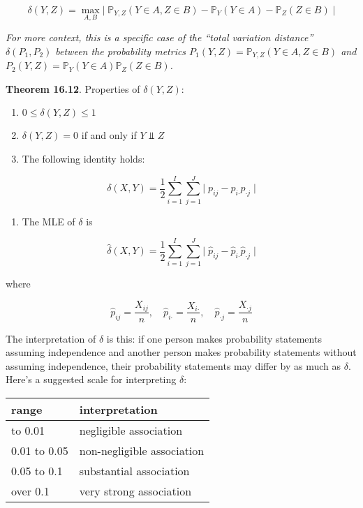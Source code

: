 {\[\delta(Y, Z) = \max_{A, B} \Big|\; \mathbb{P}_{Y, Z}(Y \in A, Z \in B) - \mathbb{P}_Y(Y \in A) - \mathbb{P}_Z(Z \in B) \;\Big|\]

\emph{For more context, this is a specific case of the ``total variation
distance'' \(\delta(P_1, P_2)\) between the probability metrics
\(P_1(Y, Z) = \mathbb{P}_{Y, Z}(Y \in A, Z \in B)\) and
\(P_2(Y, Z) = \mathbb{P}_Y(Y \in A)\mathbb{P}_Z(Z \in B)\).}

\textbf{Theorem 16.12}. Properties of \(\delta(Y, Z)\):

\begin{enumerate}[tightlist,label={\arabic*.}]
\item
  \(0 \leq \delta(Y, Z) \leq 1\)
\item
  \(\delta(Y, Z) = 0\) if and only if \(Y \text{ ⫫ } Z\)
\item
  The following identity holds:
\end{enumerate}

\[ \delta(X, Y) = \frac{1}{2} \sum_{i=1}^I \sum_{j=1}^J \Big|\; p_{ij} - p_{i\text{·}} p_{\text{·}j} \;\Big|\]

\begin{enumerate}[tightlist,label={\arabic*.},resume]
\item
  The MLE of \(\delta\) is
\end{enumerate}

\[ \hat{\delta}(X, Y) = \frac{1}{2} \sum_{i=1}^I \sum_{j=1}^J \Big|\; \hat{p}_{ij} - \hat{p}_{i\text{·}} \hat{p}_{\text{·}j} \;\Big|\]

where

\[
\hat{p}_{ij} = \frac{X_{ij}}{n},
\quad \hat{p}_{i\text{·}} = \frac{X_{i\text{·}}}{n},
\quad \hat{p}_{\text{·}j} = \frac{X_{\text{·}j}}{n}
\]

The interpretation of \(\delta\) is this: if one person makes
probability statements assuming independence and another person makes
probability statements without assuming independence, their probability
statements may differ by as much as \(\delta\). Here's a suggested scale
for interpreting \(\delta\):

\begin{longtable}[]{@{}ll@{}}
\toprule\noalign{}
range & interpretation \\
\midrule\noalign{}
\endhead
\bottomrule\noalign{}
\endlastfoot
0 to 0.01 & negligible association \\
0.01 to 0.05 & non-negligible association \\
0.05 to 0.1 & substantial association \\
over 0.1 & very strong association \\
\end{longtable}

}
